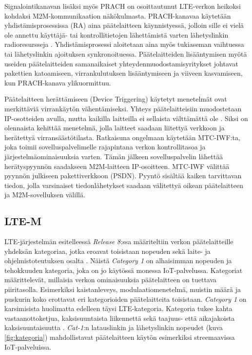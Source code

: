 \documentclass[finnish, 12pt, a4paper, elec, latin1, utf8, online]{aaltothesis}
\begin{document}
Signalointikanavan lisäksi myös PRACH on osoittautunut LTE-verkon heikoksi kohdaksi M2M-kommunikaation näkökulmasta. PRACH-kanavaa käytetään yhdistämisprosessissa (RA) aina päätelaitteen käynnistyessä, jolloin sille ei vielä ole annettu käyttäjä- tai kontrollitietojen lähettämistä varten lähetyslinkin radioresursseja \cite{ghavimi2015m2m}. Yhdistämisprosessi aloitetaan aina myös tukiaseman vaihtuessa tai lähetyslinkin ajoituksen synkronoituessa. Päätelaitteiden lisääntymisen myötä useiden päätelaitteiden samanaikaiset yhteydenmuodostamisyritykset johtavat pakettien katoamiseen, virrankulutuksen lisääntymiseen ja viiveen kasvamiseen, kun PRACH-kanava ylikuormittuu.

Päätelaitteen herättämiseen (Device Triggering) käytetyt menetelmät ovat merkittäviä virrankäytön vähentämiseksi. Yhteys päätelaitteisiin muodostetaan IP-osotteiden avulla, mutta kaikilla laitteilla ei sellaista välttämättä ole \cite{harmaala}. Siksi on olennaista kehittää menetelmä, jolla laitteet saadaan liitettyä verkkoon ja herätettyä virransäästötilasta. Ratkaisuna ongelmaan käytetään MTC-IWF:ta, joka toimii sovelluspalvelimelle rajapintana verkon kontrollitasoa ja järjestelmäominaisuuksia varten. Tämän jälkeen sovelluspalvelin lähettää herätyspyynnön saadakseen M2M-laitteen IP-osoitteen. MTC-IWF välittää pyynnön julkiseen pakettiverkkoon (PSDN). Pyyntö sisältää kaiken tarvittavan tiedon, jolla varsinaiset tiedonlähetykset saadaan välitettyä oikean päätelaitteen ja M2M-sovelluksen välillä.

\subsection{LTE-M}

LTE-järjestelmän esitelleessä \textit{Release 8}:ssa määriteltiin verkon päätelaitteille yhdeksän kategoriaa, jotka eroavat toisistaan nopeuden sekä laite- ja ohjelmistoteutuksen osalta \cite{release8}. Näistä \textit{Category 1} on alhaisimman nopeuden ja tehokkuuden kategoria, joka on jo käytössä monessa IoT-palvelussa. Kategoriat määrittelevät, millaisia verkon ominaisuuksia päätelaitteen on tuettava piiritasolla. Esimerkiksi kaistanleveys, modulaatiomenetelmä, muistin määrä ja puskurin koko erottavat eri kategorioiden päätelaitteita toisistaan. \textit{Category 1} on karsimisista huolimatta edelleen täysi LTE-kategoria. Kategoria tukee kahta vastaanottoketjua, kaksisuuntaista liikennettä sekä taajuus- että aikajakoista kaksisuuntaisuutta \cite{gsmawhitepaper}. \textit{Cat-1}:n latauslinkin ja lähetyslinkin nopeudet (kuva \ref{fig:kategoria}) mahdollistavat päätelaitteen käytön esimerkiksi streemaavissa IoT-palveluissa.
\end{document}
